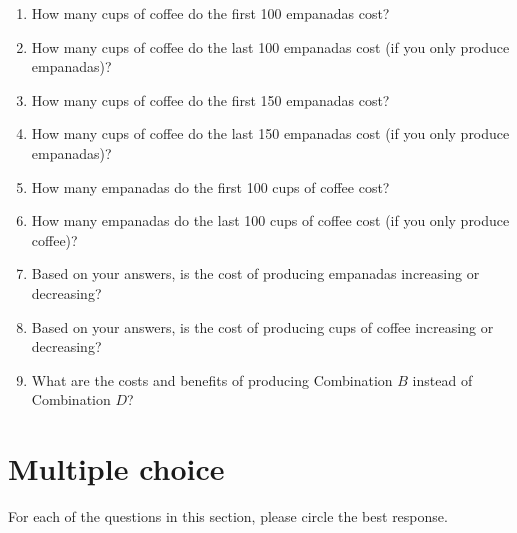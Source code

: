 \documentclass[
    letterpaper,paper=portrait,fleqn,
    DIV=16,fontsize=12pt,twoside=semi,
    parskip=full-,
    headings=standardclasses]
{scrartcl}
\begin{document}
\begin{enumerate}[resume]

\item How many cups of coffee do the first 100 empanadas cost?

\vfill

\clearpage

\item How many cups of coffee do the last 100 empanadas cost (if you only produce empanadas)?

\vfill

\item How many cups of coffee do the first 150 empanadas cost?

\vfill

\item How many cups of coffee do the last 150 empanadas cost (if you only produce empanadas)?

\vfill

\item How many empanadas do the first 100 cups of coffee cost?

\vfill

\item How many empanadas do the last 100 cups of coffee cost (if you only produce coffee)?

\vfill

\item Based on your answers, is the cost of producing empanadas increasing or decreasing?

\vfill

\item Based on your answers, is the cost of producing cups of coffee increasing or decreasing?

\vfill

\item What are the costs and benefits of producing Combination $B$ instead of Combination $D$?

\vfill

\vspace{-2\baselineskip}

\end{enumerate}

\clearpage

\section{Multiple choice}

For each of the questions in this section, please circle the best response.
\end{document}
